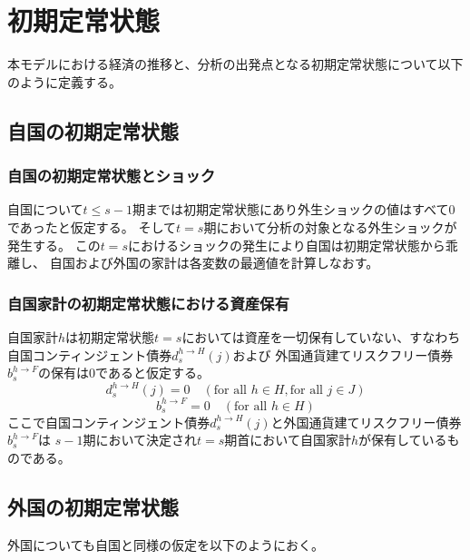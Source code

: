 
\section{初期定常状態}
\label{sec:chapter3_assumptions_steady_state}
本モデルにおける経済の推移と、分析の出発点となる初期定常状態について以下のように定義する。

\subsection{自国の初期定常状態}
\label{sec:chapter3_assumptions_steady_state_home}

\subsubsection{自国の初期定常状態とショック}
\label{sec:chapter3_assumptions_steady_state_home_shocks}
自国について\(t\le s-1\)期までは初期定常状態にあり外生ショックの値はすべて0であったと仮定する。
そして\(t=s\)期において分析の対象となる外生ショックが発生する。
この\(t=s\)におけるショックの発生により自国は初期定常状態から乖離し、
自国および外国の家計は各変数の最適値を計算しなおす。

\subsubsection{自国家計の初期定常状態における資産保有}
\label{sec:chapter3_assumptions_steady_state_home_asset_holdings}
自国家計\(h\)は初期定常状態\(t=s\)においては資産を一切保有していない、すなわち
自国コンティンジェント債券\(d_s^{h\to H}(j)\)および
外国通貨建てリスクフリー債券\(b_s^{h\to F}\)の保有は0であると仮定する。
\begin{equation}
\label{form:chapter3_assumptions_steady_state_home_asset_holdings_d_s_h_eq}
    d_s^{h\to H}(j)=0\quad(\text{for all }h\in H, \text{for all }j\in J)
\end{equation}
\begin{equation}
\label{form:chapter3_assumptions_steady_state_home_asset_holdings_b_s_h_eq}
    b_s^{h\to F}=0\quad(\text{for all }h\in H)
\end{equation}
ここで自国コンティンジェント債券\(d_s^{h\to H}(j)\)と外国通貨建てリスクフリー債券\(b_s^{h\to F}\)は
\(s-1\)期において決定され\(t=s\)期首において自国家計\(h\)が保有しているものである。

\subsection{外国の初期定常状態}
\label{sec:chapter3_assumptions_steady_state_foreign}
外国についても自国と同様の仮定を以下のようにおく。

